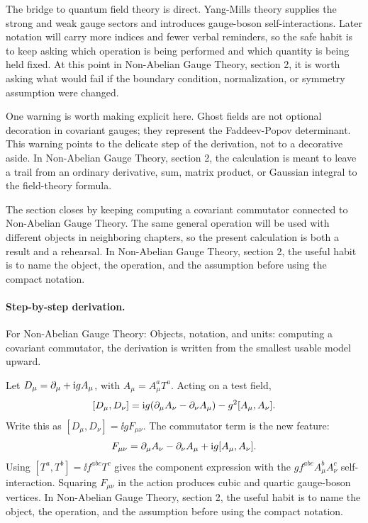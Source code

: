 The bridge to quantum field theory is direct.  Yang-Mills theory supplies the strong and weak gauge sectors and introduces gauge-boson self-interactions.  Later notation will carry more indices and fewer verbal reminders, so the safe habit is to keep asking which operation is being performed and which quantity is being held fixed.  At this point in Non-Abelian Gauge Theory, section 2, it is worth asking what would fail if the boundary condition, normalization, or symmetry assumption were changed.

One warning is worth making explicit here.  Ghost fields are not optional decoration in covariant gauges; they represent the Faddeev-Popov determinant.  This warning points to the delicate step of the derivation, not to a decorative aside.  In Non-Abelian Gauge Theory, section 2, the calculation is meant to leave a trail from an ordinary derivative, sum, matrix product, or Gaussian integral to the field-theory formula.

The section closes by keeping computing a covariant commutator connected to Non-Abelian Gauge Theory.  The same general operation will be used with different objects in neighboring chapters, so the present calculation is both a result and a rehearsal.  In Non-Abelian Gauge Theory, section 2, the useful habit is to name the object, the operation, and the assumption before using the compact notation.



\paragraph{Step-by-step derivation.}

For Non-Abelian Gauge Theory: Objects, notation, and units: computing a covariant commutator, the derivation is written from the smallest usable model upward.

Let \(D_\mu=\partial_\mu+\mathrm i gA_\mu\), with \(A_\mu=A_\mu^aT^a\).  Acting on a test field,
\[
  [D_\mu,D_\nu]
  =
  \mathrm i g(\partial_\mu A_\nu-\partial_\nu A_\mu)-g^2[A_\mu,A_\nu].
\]
Write this as \([D_\mu,D_\nu]=\ii gF_{\mu\nu}\).  The commutator term is the new feature:
\[
  F_{\mu\nu}=\partial_\mu A_\nu-\partial_\nu A_\mu+\mathrm i g[A_\mu,A_\nu].
\]
Using \([T^a,T^b]=\ii f^{abc}T^c\) gives the component expression with the \(gf^{abc}A_\mu^bA_\nu^c\) self-interaction.  Squaring \(F_{\mu\nu}\) in the action produces cubic and quartic gauge-boson vertices.  In Non-Abelian Gauge Theory, section 2, the useful habit is to name the object, the operation, and the assumption before using the compact notation.

